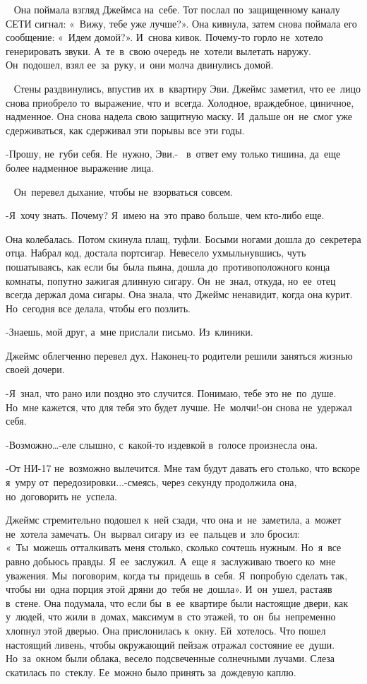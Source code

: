 ~
Она поймала взгляд Джеймса на~себе.
Тот послал по~защищенному каналу СЕТИ сигнал: «~Вижу, тебе уже лучше?».
Она кивнула, затем снова поймала его сообщение: «~Идем домой?».
И~снова кивок.
Почему-то горло не~хотело генерировать звуки.
А~те~в~свою очередь не~хотели вылетать наружу.
Он~подошел, взял ее~за~руку, и~они молча двинулись домой.

~
Стены раздвинулись, впустив их~в~квартиру Эви.
Джеймс заметил, что ее~лицо снова приобрело то~выражение, что и~всегда.
Холодное, враждебное, циничное, надменное.
Она снова надела свою защитную маску.
И~дальше он~не~смог уже сдерживаться, как сдерживал эти порывы все эти годы.
 
-Прошу, не~губи себя.
Не~нужно, Эви.- ~в~ответ ему только тишина, да~еще более надменное выражение лица.

~
Он~перевел дыхание, чтобы не~взорваться совсем.
 
-Я~хочу знать.
Почему? Я~имею на~это право больше, чем кто-либо еще.
 
Она колебалась.
Потом скинула плащ, туфли.
Босыми ногами дошла до~секретера отца.
Набрал код, достала портсигар.
Невесело ухмыльнувшись, чуть пошатываясь, как если бы~была пьяна, дошла до~противоположного конца комнаты, попутно зажигая длинную сигару.
Он~не~знал, откуда, но~ее~отец всегда держал дома сигары.
Она знала, что Джеймс ненавидит, когда она курит.
Но~сегодня все делала, чтобы его позлить.
 
-Знаешь, мой друг, а~мне прислали письмо.
Из~клиники.
 
Джеймс облегченно перевел дух.
Наконец-то родители решили заняться жизнью своей дочери.
 
-Я~знал, что рано или поздно это случится.
Понимаю, тебе это не~по~душе.
Но~мне кажется, что для тебя это будет лучше.
Не~молчи!-он снова не~удержал себя.
 
-Возможно…-еле слышно, с~какой-то издевкой в~голосе произнесла она.
 
-От НИ-17 не~возможно вылечится.
Мне там будут давать его столько, что вскоре я~умру от~передозировки...-смеясь, через секунду продолжила она, но~договорить не~успела.
 
Джеймс стремительно подошел к~ней сзади, что она и~не~заметила, а~может не~хотела замечать.
Он~вырвал сигару из~ее~пальцев и~зло бросил: «~Ты~можешь отталкивать меня столько, сколько сочтешь нужным.
Но~я~все равно добьюсь правды.
Я~ее~заслужил.
А~еще я~заслуживаю твоего ко~мне уважения.
Мы~поговорим, когда ты~придешь в~себя.
Я~попробую сделать так, чтобы ни~одна порция этой дряни до~тебя не~дошла».
И~он~ушел, растаяв в~стене.
Она подумала, что если бы~в~ее~квартире были настоящие двери, как у~людей, что жили в~домах, максимум в~сто этажей, то~он~бы~непременно хлопнул этой дверью.
Она прислонилась к~окну.
Ей~хотелось.
Что пошел настоящий ливень, чтобы окружающий пейзаж отражал состояние ее~души.
Но~за~окном были облака, весело подсвеченные солнечными лучами.
Слеза скатилась по~стеклу.
Ее~можно было принять за~дождевую каплю.
 

